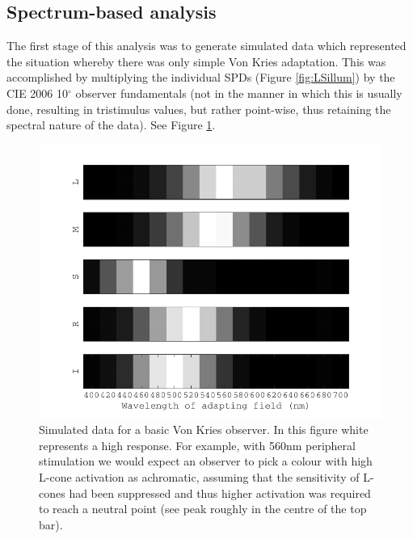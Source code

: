 

\subsection{Spectrum-based analysis}


The first stage of this analysis was to generate simulated data which represented the situation whereby there was only simple Von Kries adaptation. This was accomplished by multiplying the individual \glspl{SPD} (Figure \ref{fig:LSillum}) by the CIE 2006 10$^{\circ}$ observer fundamentals (not in the manner in which this is usually done, resulting in tristimulus values, but rather point-wise, thus retaining the spectral nature of the data). See Figure \ref{fig:LSsimdata}.

\begin{figure}[htbp]
\includegraphics[max width=\textwidth]{figs/LargeSphere/LSsimdata.pdf}
\caption{Simulated data for a basic Von Kries observer. In this figure white represents a high response. For example, with 560nm peripheral stimulation we would expect an observer to pick a colour with high L-cone activation as achromatic, assuming that the sensitivity of L-cones had been suppressed and thus higher activation was required to reach a neutral point (see peak roughly in the centre of the top bar).}
\label{fig:LSsimdata}
\end{figure}

